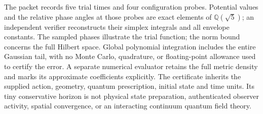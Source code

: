 The packet
records five trial times and four configuration probes. Potential values
and the relative phase angles at those probes are exact elements of
\(\mathbb Q(\sqrt5)\); an independent verifier reconstructs their
simplex integrals and all envelope constants. The sampled phases illustrate
the trial function; the norm bound concerns the full Hilbert space.
Global polynomial integration includes the entire Gaussian tail, with no
Monte Carlo, quadrature, or floating-point allowance used to certify the
error. A separate numerical evaluator retains the full metric density and
marks its approximate coefficients explicitly. The certificate inherits the
supplied action, geometry, quantum prescription, initial state and time
units. Its tiny conservative horizon is not physical state preparation,
authenticated observer activity, spatial convergence, or an interacting
continuum quantum field theory.

